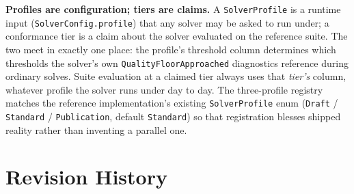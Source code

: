 \documentclass[11pt,letterpaper]{report}
\begin{document}
\begin{rationale}
\textbf{Profiles are configuration; tiers are claims.} A
\texttt{SolverProfile} is a runtime input (\texttt{SolverConfig.profile})
that any solver may be asked to run under; a conformance tier is a claim
about the solver evaluated on the reference suite. The two meet in
exactly one place: the profile's threshold column determines which
thresholds the solver's own \texttt{QualityFloorApproached} diagnostics
reference during ordinary solves. Suite evaluation at a claimed tier
always uses that \emph{tier's} column, whatever profile the solver runs
under day to day. The three-profile registry matches the reference
implementation's existing \texttt{SolverProfile} enum
(\texttt{Draft} / \texttt{Standard} / \texttt{Publication}, default
\texttt{Standard}) so that registration blesses shipped reality rather
than inventing a parallel one.
\end{rationale}

\chapter{Revision History}
\label{ch:history}
\end{document}
